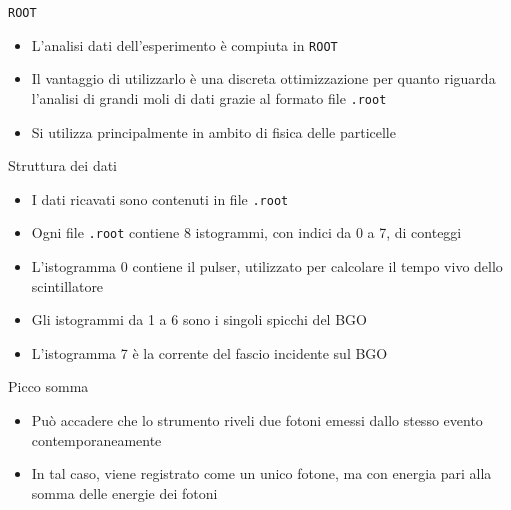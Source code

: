 \documentclass [xcolor=svgnames] {beamer}
\begin{document}
\begin{frame}{\texttt{ROOT}}
	\begin{itemize}
		\item L'analisi dati dell'esperimento è compiuta in \texttt{ROOT}
		\item Il vantaggio di utilizzarlo è una discreta ottimizzazione per quanto riguarda l'analisi di grandi moli di dati grazie al formato file \texttt{.root}
		\item Si utilizza principalmente in ambito di fisica delle particelle
	\end{itemize}
\end{frame}


\begin{frame}{Struttura dei dati}
	\begin{itemize}
			\item I dati ricavati sono contenuti in file \texttt{.root}
			\item Ogni file \texttt{.root} contiene 8 istogrammi, con indici da 0 a 7, di conteggi
			\item L'istogramma 0 contiene il pulser, utilizzato per calcolare il tempo vivo dello scintillatore
			\item Gli istogrammi da 1 a 6 sono i singoli spicchi del BGO
			\item L'istogramma 7 è la corrente del fascio incidente sul BGO
		\end{itemize}
\end{frame}

\begin{frame}{Picco somma}
	\begin{itemize}
		\item Può accadere che lo strumento riveli due fotoni emessi dallo stesso evento contemporaneamente
		\item In tal caso, viene registrato come un unico fotone, ma con energia pari alla somma delle energie dei fotoni 
	\end{itemize}
\end{frame}
\end{document}
